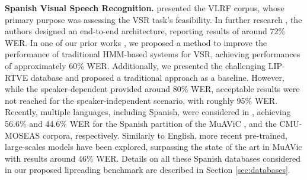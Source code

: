 \noindent\textbf{Spanish Visual Speech Recognition.} \cite{fernandez2017towards} presented the VLRF corpus, whose primary purpose was assessing the VSR task's feasibility. In further research \citep{adriana2022alr}, the authors designed an end-to-end architecture, reporting results of around 72\% WER. In one of our prior works \citep{gimeno2024continuous}, we proposed a method to improve the performance of traditional HMM-based systems for VSR, achieving performances of approximately 60\% WER. Additionally, we presented the challenging LIP-RTVE database \citep{lrec2022liprtve} and proposed a traditional approach as a baseline. However, while the speaker-dependent provided around 80\% WER, acceptable results were not reached for the speaker-independent scenario, with roughly 95\% WER. Recently, multiple languages, including Spanish, were considered in \citep{ma2022visual}, achieving 56.6\% and 44.6\% WER for the Spanish partition of the MuAViC \citep{salesky21_interspeech,anwar23muavic}, and the CMU-MOSEAS \citep{zadeh2020moseas} corpora, respectively. Similarly to English, more recent pre-trained, large-scales models \citep{yeo2024limited} have been explored, surpassing the state of the art in MuAVic with results around 46\% WER. Details on all these Spanish databases considered in our proposed lipreading benchmark are described in Section \ref{sec:databases}.
